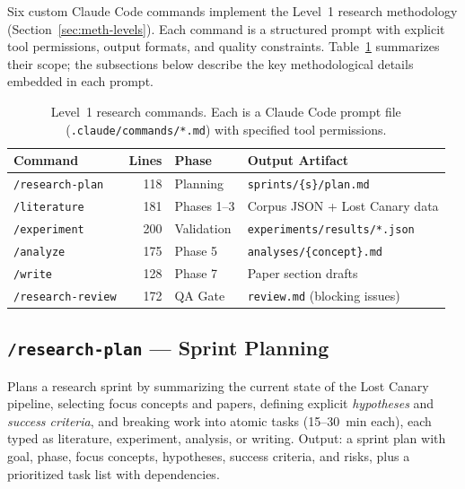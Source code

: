 \documentclass{article}
\begin{document}
%

Six custom Claude Code commands implement the Level~1 research methodology
(Section~\ref{sec:meth-levels}). Each command is a structured prompt with explicit
tool permissions, output formats, and quality constraints. Table~\ref{tab:commands}
summarizes their scope; the subsections below describe the key methodological
details embedded in each prompt.

\begin{table}[h]
\centering
\caption{Level~1 research commands. Each is a Claude Code prompt file
(\texttt{.claude/commands/*.md}) with specified tool permissions.}
\label{tab:commands}
\footnotesize
\begin{tabular}{@{} l r l l @{}}
\toprule
\textbf{Command} & \textbf{Lines} & \textbf{Phase} & \textbf{Output Artifact} \\
\midrule
\texttt{/research-plan} & 118 & Planning & \texttt{sprints/\{s\}/plan.md} \\
\texttt{/literature} & 181 & Phases 1--3 & Corpus JSON + Lost Canary data \\
\texttt{/experiment} & 200 & Validation & \texttt{experiments/results/*.json} \\
\texttt{/analyze} & 175 & Phase 5 & \texttt{analyses/\{concept\}.md} \\
\texttt{/write} & 128 & Phase 7 & Paper section drafts \\
\texttt{/research-review} & 172 & QA Gate & \texttt{review.md} (blocking issues) \\
\bottomrule
\end{tabular}
\end{table}

\subsection{\texttt{/research-plan} --- Sprint Planning}

Plans a research sprint by summarizing the current state of the Lost Canary
pipeline, selecting focus concepts and papers, defining explicit \emph{hypotheses}
and \emph{success criteria}, and breaking work into atomic tasks (15--30~min each),
each typed as literature, experiment, analysis, or writing. Output: a sprint plan
with goal, phase, focus concepts, hypotheses, success criteria, and risks, plus a
prioritized task list with dependencies.
\end{document}
